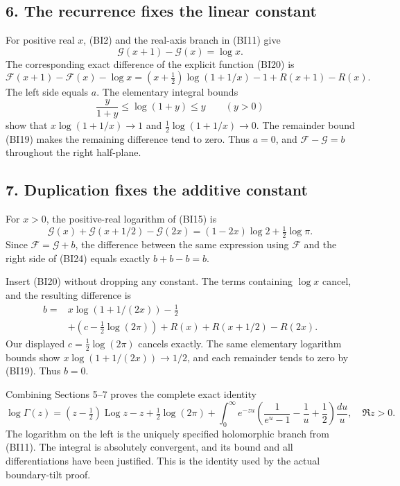 \subsection{6. The recurrence fixes the linear constant}\label{GraphV2:the-recurrence-fixes-the-linear-constant}

For positive real \(x\), (BI2) and the real-axis branch in (BI11) give \[
\mathcal G(x+1)-\mathcal G(x)=\log x.
\] The corresponding exact difference of the explicit function (BI20) is \[
\mathcal F(x+1)-\mathcal F(x)-\log x
=(x+\tfrac12)\log(1+1/x)-1+R(x+1)-R(x).
\tag{BI23}
\] The left side equals \(a\). The elementary integral bounds \[
\frac{y}{1+y}\le\log(1+y)\le y\qquad(y>0)
\] show that \(x\log(1+1/x)\to1\) and \(\tfrac12\log(1+1/x)\to0\). The remainder bound (BI19) makes the remaining difference tend to zero. Thus \(a=0\), and \(\mathcal F-\mathcal G=b\) throughout the right half-plane.

\subsection{7. Duplication fixes the additive constant}\label{GraphV2:duplication-fixes-the-additive-constant}

For \(x>0\), the positive-real logarithm of (BI15) is \[
\mathcal G(x)+\mathcal G(x+1/2)-\mathcal G(2x)
=(1-2x)\log2+\tfrac12\log\pi.
\tag{BI24}
\] Since \(\mathcal F=\mathcal G+b\), the difference between the same expression using \(\mathcal F\) and the right side of (BI24) equals exactly \(b+b-b=b\).

Insert (BI20) without dropping any constant. The terms containing \(\log x\) cancel, and the resulting difference is \[
\begin{split}
b={}&x\log(1+1/(2x))-\tfrac12\\
&+\left(c-\tfrac12\log(2\pi)\right)
 +R(x)+R(x+1/2)-R(2x).
\end{split}
\tag{BI25}
\] Our displayed \(c=\tfrac12\log(2\pi)\) cancels exactly. The same elementary logarithm bounds show \(x\log(1+1/(2x))\to1/2\), and each remainder tends to zero by (BI19). Thus \(b=0\).

Combining Sections 5--7 proves the complete exact identity \[
\boxed{
\log\Gamma(z)
=(z-\tfrac12)\operatorname{Log}z-z+\tfrac12\log(2\pi)
+\int_0^\infty e^{-zu}
\left(\frac1{e^u-1}-\frac1u+\frac12\right)\frac{du}{u},
\quad\Re z>0.}
\tag{BI26}
\] The logarithm on the left is the uniquely specified holomorphic branch from (BI11). The integral is absolutely convergent, and its bound and all differentiations have been justified. This is the identity used by the actual boundary-tilt proof.
